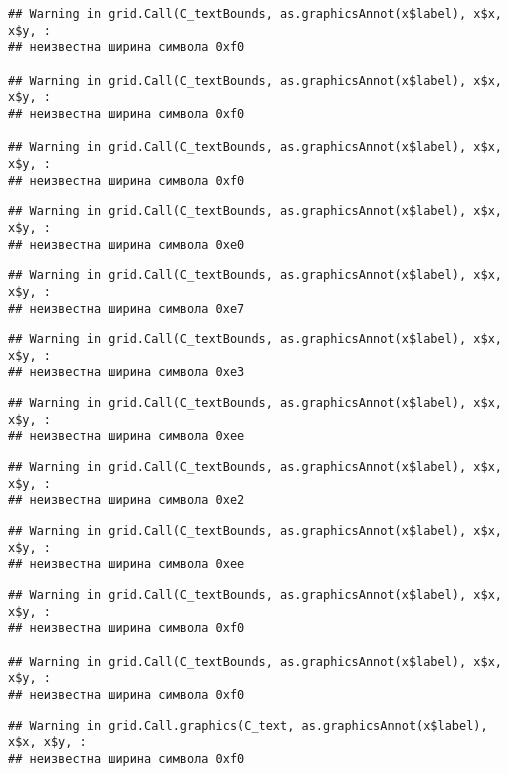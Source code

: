 \documentclass[
]{article}
\begin{document}
\begin{verbatim}
## Warning in grid.Call(C_textBounds, as.graphicsAnnot(x$label), x$x, x$y, :
## неизвестна ширина символа 0xf0

## Warning in grid.Call(C_textBounds, as.graphicsAnnot(x$label), x$x, x$y, :
## неизвестна ширина символа 0xf0

## Warning in grid.Call(C_textBounds, as.graphicsAnnot(x$label), x$x, x$y, :
## неизвестна ширина символа 0xf0
\end{verbatim}

\begin{verbatim}
## Warning in grid.Call(C_textBounds, as.graphicsAnnot(x$label), x$x, x$y, :
## неизвестна ширина символа 0xe0
\end{verbatim}

\begin{verbatim}
## Warning in grid.Call(C_textBounds, as.graphicsAnnot(x$label), x$x, x$y, :
## неизвестна ширина символа 0xe7
\end{verbatim}

\begin{verbatim}
## Warning in grid.Call(C_textBounds, as.graphicsAnnot(x$label), x$x, x$y, :
## неизвестна ширина символа 0xe3
\end{verbatim}

\begin{verbatim}
## Warning in grid.Call(C_textBounds, as.graphicsAnnot(x$label), x$x, x$y, :
## неизвестна ширина символа 0xee
\end{verbatim}

\begin{verbatim}
## Warning in grid.Call(C_textBounds, as.graphicsAnnot(x$label), x$x, x$y, :
## неизвестна ширина символа 0xe2
\end{verbatim}

\begin{verbatim}
## Warning in grid.Call(C_textBounds, as.graphicsAnnot(x$label), x$x, x$y, :
## неизвестна ширина символа 0xee
\end{verbatim}

\begin{verbatim}
## Warning in grid.Call(C_textBounds, as.graphicsAnnot(x$label), x$x, x$y, :
## неизвестна ширина символа 0xf0

## Warning in grid.Call(C_textBounds, as.graphicsAnnot(x$label), x$x, x$y, :
## неизвестна ширина символа 0xf0
\end{verbatim}

\begin{verbatim}
## Warning in grid.Call.graphics(C_text, as.graphicsAnnot(x$label), x$x, x$y, :
## неизвестна ширина символа 0xf0
\end{verbatim}
\end{document}

